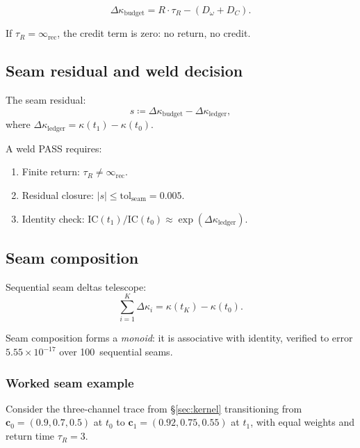 \documentclass[
  aps,
  prd,
  twocolumn,
  superscriptaddress,
  nofootinbib,
  floatfix
]{revtex4-2}
\newcommand{\tR}{\tau_{\!R}}
\newcommand{\IR}{\infty_{\mathrm{rec}}}
\newcommand{\tolseam}{\mathrm{tol}_{\mathrm{seam}}}
\newcommand{\beq}{\begin{equation}}
\newcommand{\eeq}{\end{equation}}
\newcommand{\regime}[1]{\textrm{\scshape#1}}
\newcommand{\tvec}{\mathbf{c}}
\newcommand{\IC}{\mathrm{IC}}
\begin{document}
\beq
  \Delta\kappa_{\mathrm{budget}} = R \cdot \tR
  - (D_\omega + D_C).
\eeq

If $\tR = \IR$, the credit term is zero: no return, no credit.

\subsection{Seam residual and weld decision}

The seam residual:
\beq
  s \coloneqq \Delta\kappa_{\mathrm{budget}}
    - \Delta\kappa_{\mathrm{ledger}},
\eeq
where $\Delta\kappa_{\mathrm{ledger}} = \kappa(t_1) - \kappa(t_0)$.

A weld \regime{PASS} requires:
\begin{enumerate}[leftmargin=*,label=(\arabic*)]
\item Finite return: $\tR \neq \IR$.
\item Residual closure: $|s| \leq \tolseam = 0.005$.
\item Identity check: $\IC(t_1)/\IC(t_0)
  \approx \exp(\Delta\kappa_{\mathrm{ledger}})$.
\end{enumerate}

\subsection{Seam composition}

Sequential seam deltas telescope:
\beq
  \sum_{i=1}^{K} \Delta\kappa_i = \kappa(t_K) - \kappa(t_0).
\eeq

Seam composition forms a \emph{monoid}: it is associative with
identity, verified to error $5.55 \times 10^{-17}$ over
100~sequential seams.

\subsubsection{Worked seam example}

Consider the three-channel trace from \S\ref{sec:kernel}
transitioning from $\tvec_0 = (0.9, 0.7, 0.5)$ at $t_0$ to
$\tvec_1 = (0.92, 0.75, 0.55)$ at $t_1$, with equal weights and
return time $\tR = 3$.
\end{document}
